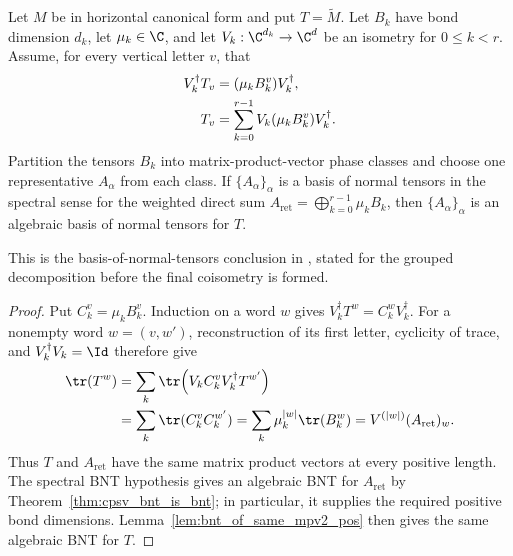 \begin{theorem}
    \label{thm:mpdo_vertical_grouped_is_bnt}
    \leanok
    Let $M$ be in horizontal canonical form and put $T=\widetilde M$. Let
    $B_k$ have bond dimension $d_k$, let $\mu_k\in\C$, and let
    $V_k:\C^{d_k}\to\C^d$ be an isometry for $0\leq k<r$. Assume, for every
    vertical letter $v$, that
    \begin{align}
        V_k^\dagger T_v&=(\mu_kB_k^v)V_k^\dagger,
        \notag\\
        T_v&=\sum_{k=0}^{r-1}V_k(\mu_kB_k^v)V_k^\dagger.
        \notag
    \end{align}
    Partition the tensors $B_k$ into matrix-product-vector phase classes and
    choose one representative $A_\alpha$ from each class. If
    $\{A_\alpha\}_\alpha$ is a basis of normal tensors in the spectral sense
    for the weighted direct sum
    $A_{\mathrm{ret}}=\bigoplus_{k=0}^{r-1}\mu_kB_k$, then
    $\{A_\alpha\}_\alpha$ is an algebraic basis of normal tensors for $T$.

    This is the basis-of-normal-tensors conclusion in
    \cite[Proposition~4.13, lines~1863--1921]{Cirac2016MPDO_arXiv}, stated for
    the grouped decomposition before the final coisometry is formed.
\end{theorem}

\begin{proof}
    \leanok
    Put $C_k^v=\mu_kB_k^v$. Induction on a word $w$ gives
    $V_k^\dagger T^w=C_k^wV_k^\dagger$.
    For a nonempty word $w=(v,w')$, reconstruction of its first letter,
    cyclicity of trace, and $V_k^\dagger V_k=\Id$ therefore give
    \begin{align}
        \tr(T^w)
        &=\sum_k\tr\!\left(V_kC_k^vV_k^\dagger T^{w'}\right)
        \notag\\
        &=\sum_k\tr(C_k^vC_k^{w'})
          =\sum_k\mu_k^{|w|}\tr(B_k^w)
          =V^{(|w|)}(A_{\mathrm{ret}})_w.
        \notag
    \end{align}
    Thus $T$ and $A_{\mathrm{ret}}$ have the same matrix product vectors at
    every positive length. The spectral BNT hypothesis gives an algebraic BNT
    for $A_{\mathrm{ret}}$ by Theorem~\ref{thm:cpsv_bnt_is_bnt}; in particular,
    it supplies the required positive bond dimensions.
    Lemma~\ref{lem:bnt_of_same_mpv2_pos} then gives the same algebraic BNT for
    $T$.
\end{proof}

